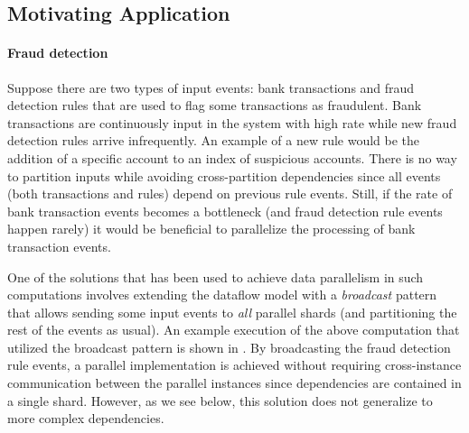 \label{sec:distribution}

\subsection{Motivating Application}
\label{ssec:motivating-application}

\paragraph{Fraud detection}
Suppose there are two types of input events: bank transactions and fraud detection rules
that are used to flag some transactions as fraudulent. Bank
transactions are continuously input in the system with high rate while new
fraud detection rules arrive infrequently. An example of a new rule would
be the addition of a specific account to an index of suspicious accounts.
There is no way to partition inputs while
avoiding cross-partition dependencies since all events (both
transactions and rules) depend on previous rule events. Still, if the
rate of bank transaction events becomes a bottleneck (and fraud
detection rule events happen rarely) it would be beneficial to
parallelize the processing of bank transaction events.

One of the solutions that has been used to achieve data parallelism in
such computations involves extending the dataflow model with a
\emph{broadcast} pattern that allows sending some input events to \emph{all}
parallel shards (and partitioning the rest of the events as usual). An
example execution of the above computation that utilized the broadcast
pattern is shown in . By
broadcasting the fraud detection rule events, a parallel implementation
is achieved without requiring cross-instance communication between the
parallel instances since dependencies are contained in a single
shard. However, as we see below, this solution does not generalize to
more complex dependencies.

